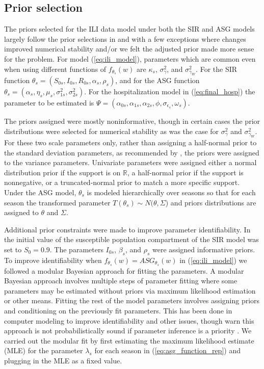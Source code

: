 \documentclass[ba]{imsart}
\theoremstyle{plain}
\theoremstyle{definition}
\theoremstyle{remark}
\begin{document}
\subsection{Prior selection}


The priors selected for the ILI data model under both the SIR and ASG models largely follow the prior selections in \cite{osthus2019dynamic} and \cite{ulloa2019} with a few exceptions where changes improved numerical stability and/or we felt the adjusted prior made more sense for the problem. For model (\ref{eq:ili_model}), parameters which are common even when using different functions of $f_{\theta_s}(w)$ are $\kappa_s$, $\sigma_{\gamma}^2$, and $\sigma_{\gamma_W}^2$. For the SIR function $\theta_s = (S_{0s}, I_{0s}, R_{0s}, \alpha_s, \rho_s)$, and for the ASG function $\theta_s = (\alpha_s, \eta_s, \mu_s, \sigma_{1s}^2, \sigma_{2s}^2)$. For the hospitalization model in (\ref{eq:final_hosp}) the parameter to be estimated is $\Psi = (\alpha_{0s}, \alpha_{1s}, \alpha_{2s}, \phi, \sigma_{\epsilon_s}, \omega_s)$. 


The priors assigned were mostly noninformative, though in certain cases the prior distributions were selected for numerical stability as was the case for $\sigma_{\gamma}^2$ and $\sigma_{\gamma_W}^2$. For these two scale parameters only, rather than assigning a half-normal prior to the standard deviation parameters, as recommended by \cite{gelman2006prior}, the priors were assigned to the variance parameters. Univariate parameters were assigned either a normal distribution prior if the support is on $\mathbb{R}$, a half-normal prior if the support is nonnegative, or a truncated-normal prior to match a more specific support. Under the ASG model, $\theta_s$ is modeled hierarchically over seasons so that for each season the transformed parameter $T(\theta_s) \sim N(\theta, \Sigma$) and priors distributions are assigned to $\theta$ and $\Sigma$.



 
Additional prior constraints were made to improve parameter identifiability. In \cite{osthus2019dynamic} the initial value of the susceptible population compartment of the SIR model was set to $S_0 = 0.9$. The parameters $I_{0s}$, $\beta_s$, and $\rho_s$ were assigned informative priors. To improve identifiability when $f_{\theta_s}(w) = ASG_{\theta_s}(w)$ in (\ref{eq:ili_model}) we followed a modular Bayesian approach for fitting the parameters. A modular Bayesian approach involves multiple steps of parameter fitting where some parameters may be estimated without priors via maximum likelihood estimation or other means. Fitting the rest of the model parameters involves assigning priors and conditioning on the previously fit parameters. This has been done in computer modeling to improve identifiability and other issues, though \cite{liu2009modularization} warn this approach is not probabilistically sound if parameter inference is a priority \cite[]{jiang2015surrogate, arendt2012improving, liu2009modularization}. We carried out the modular fit by first estimating the maximum likelihood estimate (MLE) for the parameter $\lambda_s$ for each season in (\ref{eq:asg_function_rep}) and plugging in the MLE as a fixed value.
\end{document}
